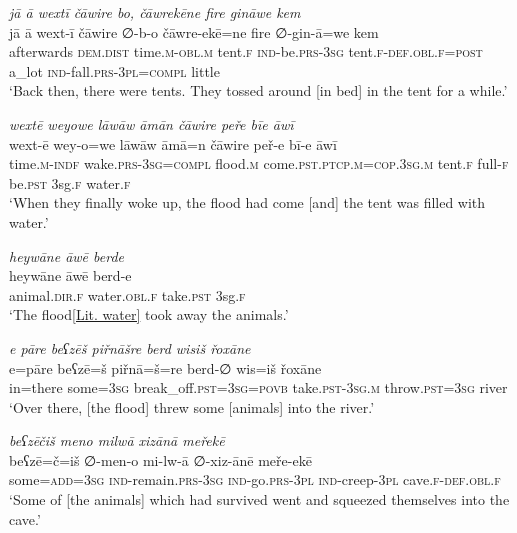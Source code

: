 \ea \label{ZB.19}
\textit{jā ā wextī čāwire bo, čāwrekēne fire gināwe kem} \\ 
\gll jā ā wext-ī čāwire ∅-b-o čāwre-ekē=ne fire ∅-gin-ā=we kem \\ 
 afterwards \textsc{dem.dist} time\textsc{.m}\textsc{-obl}\textsc{.m} tent\textsc{.f} \textsc{ind-}be\textsc{.prs}\textsc{-3sg} tent\textsc{.f}\textsc{-def}\textsc{.obl}\textsc{.f}\textsc{=\textsc{post}} a\_lot \textsc{ind-}fall\textsc{.prs}\textsc{-3pl}\textsc{=compl} little \\ 
\glt `Back then, there were tents. They tossed around [in bed] in the tent for a while.'
\z 
 
\ea \label{ZB.20}
\textit{wextē weyowe lāwāw āmān čāwire peře bīe āwī} \\ 
\gll wext-ē wey-o=we lāwāw āmā=n čāwire peř-e bī-e āwī \\ 
 time\textsc{.m}\textsc{-indf} wake\textsc{.prs}\textsc{-3sg}\textsc{=compl} flood\textsc{.m} come\textsc{.pst}\textsc{.ptcp}\textsc{.m}\textsc{=cop}\textsc{.3sg}\textsc{.m} tent\textsc{.f} full\textsc{-f} be\textsc{.pst} 3sg\textsc{.f} water\textsc{.f} \\ 
\glt `When they finally woke up, the flood had come [and] the tent was filled with water.'
\z 
 
\ea \label{ZB.21}
\textit{heywāne āwē berde} \\ 
\gll heywāne āwē berd-e \\ 
 animal\textsc{.dir}\textsc{.f} water\textsc{.obl}\textsc{.f} take\textsc{.pst} 3sg\textsc{.f} \\ 
\glt `The flood\ref{Lit. water} took away the animals.'
\z 
 
\ea \label{ZB.22}
\textit{e pāre beʕzēš piřnāšre berd wisiš řoxāne} \\ 
\gll e=pāre beʕzē=š piřnā=š=re berd-∅ wis=iš řoxāne \\ 
 in=there some\textsc{=3sg} break\_off\textsc{.pst}\textsc{=3sg}\textsc{=\textsc{povb}} take\textsc{.pst}\textsc{-3sg}\textsc{.m} throw\textsc{.pst}\textsc{=3sg} river \\ 
\glt `Over there, [the flood] threw some [animals] into the river.'
\z 
 
\ea \label{ZB.23}
\textit{beʕzēčiš meno milwā xizānā meřekē} \\ 
\gll beʕzē=č=iš ∅-men-o mi-lw-ā ∅-xiz-ānē meře-ekē \\ 
 some\textsc{=add}\textsc{=3sg} \textsc{ind-}remain\textsc{.prs}\textsc{-3sg} \textsc{ind-}go\textsc{.prs}\textsc{-3pl} \textsc{ind-}creep\textsc{-3pl} cave\textsc{.f}\textsc{-def}\textsc{.obl}\textsc{.f} \\ 
\glt `Some of [the animals] which had survived went and squeezed themselves into the cave.'
\z 
 
